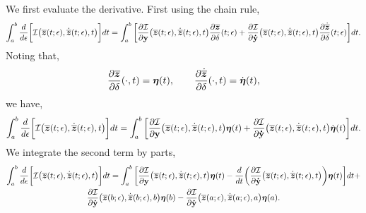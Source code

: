 \documentclass[3p,computermodern,10pt]{elsarticle}
\begin{document}
\begin{appendices}
We first evaluate the derivative. First using the chain rule,
$$ \int_a^b \frac{d}{d\epsilon}\bigg[ \mathcal{I} \big(\overline{\boldsymbol z}(t;\epsilon),\dot{\overline{\boldsymbol z}}(t;\epsilon) ,t\big) \bigg] dt = \int_a^b \bigg[ \frac{\partial \mathcal{I}  }{\partial \mathbf{y} } \big(\overline{\boldsymbol z}(t;\epsilon),\dot{\overline{\boldsymbol z}}(t;\epsilon) ,t\big) \frac{\partial \overline{\boldsymbol z} }{\partial \delta}(t;\epsilon)  + \frac{\partial \mathcal{I}}{\partial \mathbf{\dot{y}} } \big(\overline{\boldsymbol z}(t;\epsilon),\dot{\overline{\boldsymbol z}}(t;\epsilon) ,t \big) \frac{\partial \dot{\overline{\boldsymbol z}}}{\partial \delta} (t;\epsilon)\bigg]dt . $$
Noting that,
$$\frac{\partial \overline{\boldsymbol z}}{\partial \delta} (\cdot,t)= \boldsymbol \eta(t), \qquad \frac{\partial \dot{\overline{\boldsymbol z}} }{\partial \delta}(\cdot,t)= \dot{\boldsymbol \eta}(t),$$
we have,
$$\int_a^b \frac{d}{d\epsilon}\bigg[ \mathcal{I} \big(\overline{\boldsymbol z}(t;\epsilon),\dot{\overline{\boldsymbol z}}(t;\epsilon) ,t \big) \bigg] dt = \int_a^b \bigg[ \frac{\partial \mathcal{I}  }{\partial \mathbf{y} } \big(\overline{\boldsymbol z}(t;\epsilon),\dot{\overline{\boldsymbol z}}(t;\epsilon),t \big) \boldsymbol \eta(t)  + \frac{\partial \mathcal{I}}{\partial \mathbf{\dot{y}} } \big(\overline{\boldsymbol z}(t;\epsilon),\dot{\overline{\boldsymbol z}}(t;\epsilon) ,t \big) \dot{\boldsymbol \eta}(t) \bigg]dt. $$
We integrate the second term by parts,
\begin{multline*}
\int_a^b \frac{d}{d\epsilon}\bigg[ \integrand \big(\statezBar(t;\epsilon),\statezDotBar(t;\epsilon) ,t \big) \bigg] dt =  \int_a^b  \bigg[\frac{\partial \integrand  }{\partial \stateyDiscrete } \big(\statezBar(t;\epsilon),\statezDotBar(t;\epsilon) ,t \big) \variation(t) - \frac{d}{dt}\bigg( \frac{\partial \integrand}{\partial \stateyDotDiscrete }  \big(\statezBar(t;\epsilon),\statezDotBar(t;\epsilon) ,t \big) \bigg) \variation(t) \bigg]dt + \\ \frac{\partial \integrand}{\partial \stateyDotDiscrete} \big(\statezBar(b;\epsilon),\statezDotBar(b;\epsilon) ,b \big) \variation(b)  - \frac{\partial \integrand}{\partial \stateyDotDiscrete} \big(\statezBar(a;\epsilon),\statezDotBar(a;\epsilon) ,a\big) \variation(a) .

\end{multline*}
\end{appendices}
\end{document}
